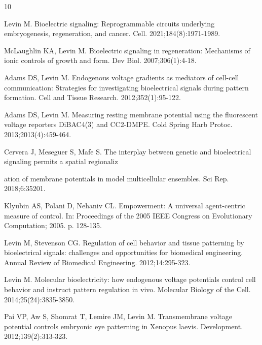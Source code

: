 \documentclass[10pt,letterpaper]{article}
\begin{document}
%
%
% 
\begin{thebibliography}{10}

Levin M. Bioelectric signaling: Reprogrammable circuits underlying embryogenesis, regeneration, and cancer. Cell. 2021;184(8):1971-1989.

McLaughlin KA, Levin M. Bioelectric signaling in regeneration: Mechanisms of ionic controls of growth and form. Dev Biol. 2007;306(1):4-18.

Adams DS, Levin M. Endogenous voltage gradients as mediators of cell-cell communication: Strategies for investigating bioelectrical signals during pattern formation. Cell and Tissue Research. 2012;352(1):95-122.

Adams DS, Levin M. Measuring resting membrane potential using the fluorescent voltage reporters DiBAC4(3) and CC2-DMPE. Cold Spring Harb Protoc. 2013;2013(4):459-464.

Cervera J, Meseguer S, Mafe S. The interplay between genetic and bioelectrical signaling permits a spatial regionaliz

ation of membrane potentials in model multicellular ensembles. Sci Rep. 2018;6:35201.

Klyubin AS, Polani D, Nehaniv CL. Empowerment: A universal agent-centric measure of control. In: Proceedings of the 2005 IEEE Congress on Evolutionary Computation; 2005. p. 128-135.

Levin M, Stevenson CG. Regulation of cell behavior and tissue patterning by bioelectrical signals: challenges and opportunities for biomedical engineering. Annual Review of Biomedical Engineering. 2012;14:295-323.

Levin M. Molecular bioelectricity: how endogenous voltage potentials control cell behavior and instruct pattern regulation in vivo. Molecular Biology of the Cell. 2014;25(24):3835-3850.

Pai VP, Aw S, Shomrat T, Lemire JM, Levin M. Transmembrane voltage potential controls embryonic eye patterning in Xenopus laevis. Development. 2012;139(2):313-323.


\end{thebibliography}
\end{document}

